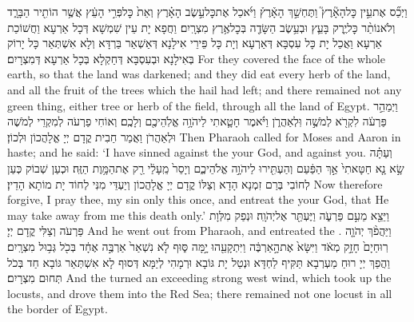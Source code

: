 {וַיְכַ֞ס אֶת\maqqaf עֵ֣ין כׇּל\maqqaf הָאָ֘רֶץ֮ וַתֶּחְשַׁ֣ךְ הָאָ֒רֶץ֒ וַיֹּ֜אכַל אֶת\maqqaf כׇּל\maqqaf עֵ֣שֶׂב הָאָ֗רֶץ וְאֵת֙ כׇּל\maqqaf פְּרִ֣י הָעֵ֔ץ אֲשֶׁ֥ר הוֹתִ֖יר הַבָּרָ֑ד וְלֹא\maqqaf נוֹתַ֨ר כׇּל\maqqaf יֶ֧רֶק בָּעֵ֛ץ וּבְעֵ֥שֶׂב הַשָּׂדֶ֖ה בְּכׇל\maqqaf אֶ֥רֶץ מִצְרָֽיִם׃}
{וַחֲפָא יָת עֵין שִׁמְשָׁא דְּכָל אַרְעָא וַחֲשׁוֹכַת אַרְעָא וַאֲכַל יָת כָּל עִסְבָּא דְּאַרְעָא וְיָת כָּל פֵּירֵי אִילָנָא דְּאַשְׁאַר בַּרְדָּא וְלָא אִשְׁתְּאַר כָּל יָרוֹק בְּאִילָנָא וּבְעִסְבָּא דְּחַקְלָא בְּכָל אַרְעָא דְּמִצְרָיִם׃}
{For they covered the face of the whole earth, so that the land was darkened; and they did eat every herb of the land, and all the fruit of the trees which the hail had left; and there remained not any green thing, either tree or herb of the field, through all the land of Egypt.}{}
{וַיְמַהֵ֣ר פַּרְעֹ֔ה לִקְרֹ֖א לְמֹשֶׁ֣ה וּֽלְאַהֲרֹ֑ן וַיֹּ֗אמֶר חָטָ֛אתִי לַיהֹוָ֥ה אֱלֹֽהֵיכֶ֖ם וְלָכֶֽם׃}
{וְאוֹחִי פַרְעֹה לְמִקְרֵי לְמֹשֶׁה וּלְאַהֲרֹן וַאֲמַר חַבִית קֳדָם יְיָ אֱלָהֲכוֹן וּלְכוֹן׃}
{Then Pharaoh called for Moses and Aaron in haste; and he said: ‘I have sinned against the \lord\space your God, and against you.}{}
{וְעַתָּ֗ה שָׂ֣א נָ֤א חַטָּאתִי֙ אַ֣ךְ הַפַּ֔עַם וְהַעְתִּ֖ירוּ לַיהֹוָ֣ה אֱלֹהֵיכֶ֑ם וְיָסֵר֙ מֵֽעָלַ֔י רַ֖ק אֶת\maqqaf הַמָּ֥וֶת הַזֶּֽה׃}
{וּכְעַן שְׁבוֹק כְּעַן לְחוֹבִי בְּרַם זִמְנָא הָדָא וְצַלּוֹ קֳדָם יְיָ אֱלָהֲכוֹן וְיַעְדֵּי מִנִּי לְחוֹד יָת מוֹתָא הָדֵין׃}
{Now therefore forgive, I pray thee, my sin only this once, and entreat the \lord\space your God, that He may take away from me this death only.’}{}
{וַיֵּצֵ֖א מֵעִ֣ם פַּרְעֹ֑ה וַיֶּעְתַּ֖ר אֶל\maqqaf יְהֹוָֽה׃}
{וּנְפַק מִלְּוָת פַּרְעֹה וְצַלִּי קֳדָם יְיָ׃}
{And he went out from Pharaoh, and entreated the \lord.}{}
{וַיַּהֲפֹ֨ךְ יְהֹוָ֤ה רֽוּחַ\maqqaf יָם֙ חָזָ֣ק מְאֹ֔ד וַיִּשָּׂא֙ אֶת\maqqaf הָ֣אַרְבֶּ֔ה וַיִּתְקָעֵ֖הוּ יָ֣מָּה סּ֑וּף לֹ֤א נִשְׁאַר֙ אַרְבֶּ֣ה אֶחָ֔ד בְּכֹ֖ל גְּב֥וּל מִצְרָֽיִם׃}
{וַהֲפַךְ יְיָ רוּחַ מַעְרְבָא תַּקִּיף לַחְדָּא וּנְטַל יָת גּוֹבָא וּרְמָהִי לְיַמָּא דְּסוּף לָא אִשְׁתְּאַר גּוֹבָא חַד בְּכֹל תְּחוּם מִצְרָיִם׃}
{And the \lord\space turned an exceeding strong west wind, which took up the locusts, and drove them into the Red Sea; there remained not one locust in all the border of Egypt.}{}
